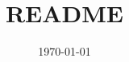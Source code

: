 \documentclass[a4paper,12pt]{scrartcl}
\title{README}
\author{\autor}
\date{\today}
\begin{document}
	\maketitle
	\tableofcontents 
	\newpage	
	\listoffigures 
	\listoftables 
	\lstlistoflistings
	\newpage


			
			

	\printbibliography%
\end{document}

